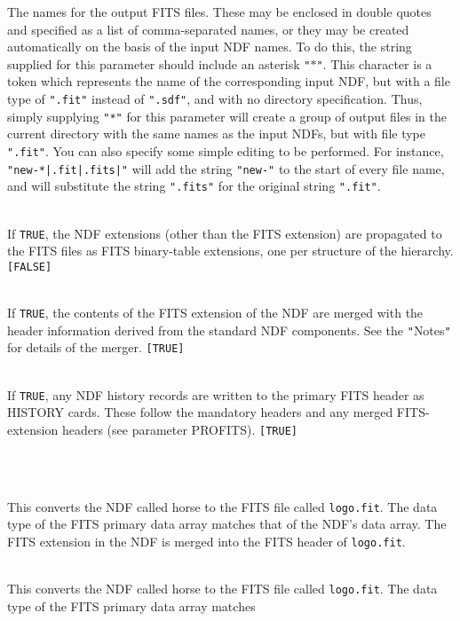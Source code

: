 \documentclass[twoside,11pt]{article}
\newcommand{\htmlref}[2]{#1}
\newlength{\sstexampleslength}
\newcommand{\sstexamples}[1]{
   \goodbreak
   \item[Examples:] \mbox{} \\
   \vspace{-3.5ex}
   \begin{description}
      #1
   \end{description}
}
\newcommand{\sstsubsection}[1]{ \item[{#1}] \mbox{} \\}
\newcommand{\sstexamplesubsection}[2]{\sloppy
\item[\parbox{\sstexampleslength}{\ssttt #1}] \mbox{} \vspace{0.5ex}
\\ #2 \vspace{1.0ex}}
\newcommand{\sstexamples}[1]{
   \item[\vspace{0.35ex}\htmlref{Examples:\vspace{-0.5ex}}{app_example}]
      \begin{description}
         #1
      \end{description}
      \\
   }
\newcommand{\sstsubsection}[1]{\item[{#1}]}
\newcommand{\sstexamplesubsection}[2]{
   \vspace{-1.0ex} \item[{\ssttt #1}] #2 \vspace{0.2ex}}
\begin{document}
{{{      }{
         The names for the output FITS files.  These may be enclosed in double
         quotes and specified as a list of comma-separated names, or they may
         be created automatically on the basis of the input NDF names. To do
         this, the string supplied for this parameter should include an
         asterisk \texttt{"$*$"}. This character is a token which represents
         the name of the corresponding input NDF, but with a file type of
         \texttt{".fit"} instead of \texttt{".sdf"}, and with no directory
         specification. Thus, simply supplying \texttt{"*"} for this parameter
         will create a group of output files in the current directory with the 
         same names as the input NDFs, but with file type \texttt{".fit"}. 
         You can also specify some simple editing to be performed. For instance,
         \texttt{"new-*|.fit|.fits|"} will add the string \texttt{"new-"} to
         the start of every file name, and will substitute the string
         \texttt{".fits"} for the original string \texttt{".fit"}.
      }
      \sstsubsection{
         PROEXTS = \_LOGICAL (Read)
      }{
         If \texttt{TRUE}, the NDF extensions (other than the FITS extension)
         are propagated to the FITS files as FITS binary-table
         extensions, one per structure of the hierarchy. \texttt{[FALSE]}
      }
      \sstsubsection{
         PROFITS = \_LOGICAL (Read)
      }{
         If \texttt{TRUE}, the contents of the FITS extension of the NDF are
         merged with the header information derived from the standard
         NDF components.  See the \texttt{"}Notes\texttt{"} for details of the merger.
         \texttt{[TRUE]}
      }
      \sstsubsection{
         PROHIS = \_LOGICAL (Read)
      }{
         If \texttt{TRUE}, any NDF history records are written to the primary
         FITS header as HISTORY cards.  These follow the mandatory
         headers and any merged FITS-extension headers (see parameter
         PROFITS). \texttt{[TRUE]}
      }
   }
   \sstexamples{
      \sstexamplesubsection{
         ndf2fits horse logo.fit d
      }{
         This converts the NDF called horse to the FITS file called
         \texttt{logo.fit}.  The data type of the FITS primary data array
         matches that of the NDF's data array.  The FITS extension in the NDF
         is merged into the FITS header of \texttt{logo.fit}.
      }
      \sstexamplesubsection{
         ndf2fits horse logo.fit d proexts
      }{
         This converts the NDF called horse to the FITS file called
         \texttt{logo.fit}.
         The data type of the FITS primary data array matches
}}}
\end{document}
